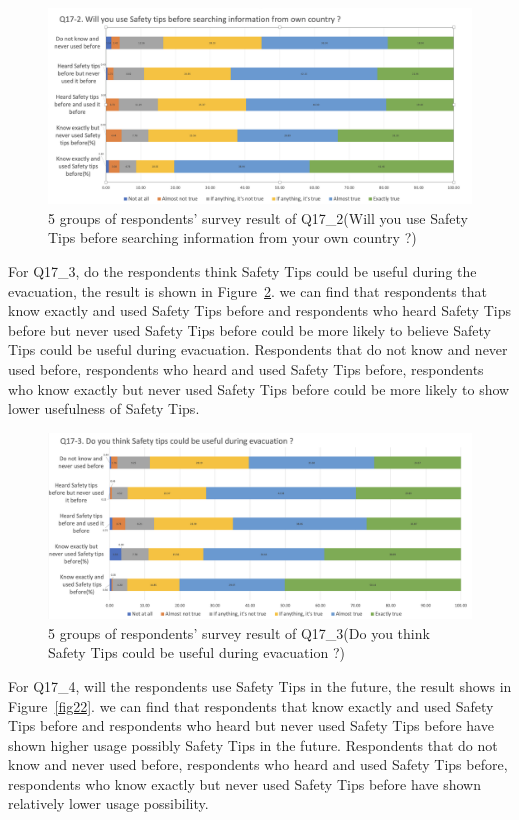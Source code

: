\begin{figure}[h]
  \includegraphics[width=0.8\linewidth]{Figure/Figure20.jpg}
  \centering
  \caption[5 groups of respondents' survey result of Q17\_2]{5 groups of respondents' survey result of Q17\_2(Will you use Safety Tips before searching information from your own country ?)}
  \label{fig20}
\end{figure}

For Q17\_3, do the respondents think Safety Tips could be useful during the evacuation, the result is shown in Figure~\ref{fig21}. we can find that respondents that know exactly and used Safety Tips before and respondents who heard Safety Tips before but never used Safety Tips before could be more likely to believe Safety Tips could be useful during evacuation. Respondents that do not know and never used before, respondents who heard and used Safety Tips before, respondents who know exactly but never used Safety Tips before could be more likely to show lower usefulness of Safety Tips. 

\begin{figure}[h]
  \includegraphics[width=0.8\linewidth]{Figure/Figure21.jpg}
  \centering
  \caption[5 groups of respondents' survey result of Q17\_3]{5 groups of respondents' survey result of Q17\_3(Do you think Safety Tips could be useful during evacuation ?)}
  \label{fig21}
\end{figure}

For Q17\_4, will the respondents use Safety Tips in the future, the result shows in Figure~\ref{fig22}. we can find that respondents that know exactly and used Safety Tips before and respondents who heard but never used Safety Tips before have shown higher usage possibly Safety Tips in the future. Respondents that do not know and never used before, respondents who heard and used Safety Tips before, respondents who know exactly but never used Safety Tips before have shown relatively lower usage possibility.

